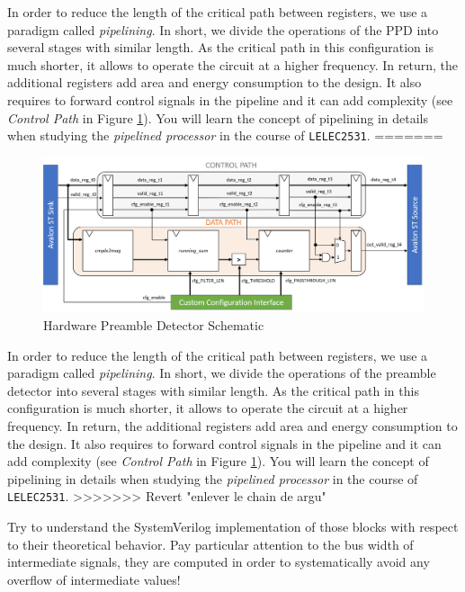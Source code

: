 \begin{enumerate}
In order to reduce the length of the critical path between registers, we use a paradigm called \textit{pipelining}. In short, we divide the operations of the PPD into several stages with similar length. As the critical path in this configuration is much shorter, it allows to operate the circuit at a higher frequency. In return, the additional registers add area and energy consumption to the design. It also requires to forward control signals in the pipeline and it can add complexity (see \textit{Control Path} in Figure \ref{fig:pd_schematic}). You will learn the concept of pipelining in details when studying the \textit{pipelined processor} in the course of \texttt{LELEC2531}.
=======
\begin{figure}[!h]
    \centering
    \includegraphics[width=\linewidth]{figures/preamble_detect_block.png}
    \caption{Hardware Preamble Detector Schematic}
    \label{fig:pd_schematic}
\end{figure}

In order to reduce the length of the critical path between registers, we use a paradigm called \textit{pipelining}. In short, we divide the operations of the preamble detector into several stages with similar length. As the critical path in this configuration is much shorter, it allows to operate the circuit at a higher frequency. In return, the additional registers add area and energy consumption to the design. It also requires to forward control signals in the pipeline and it can add complexity (see \textit{Control Path} in Figure \ref{fig:pd_schematic}). You will learn the concept of pipelining in details when studying the \textit{pipelined processor} in the course of \texttt{LELEC2531}.
>>>>>>> Revert "enlever le chain de argu"

Try to understand the SystemVerilog implementation of those blocks with respect to their theoretical behavior. Pay particular attention to the bus width of intermediate signals, they are computed in order to systematically avoid any overflow of intermediate values!



\end{enumerate}
